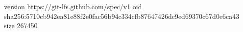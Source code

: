 version https://git-lfs.github.com/spec/v1
oid sha256:5710cb942ea81e88f2e0fac56b94c334cfb87647426dc9ed69370c67d0e6ca43
size 267450
